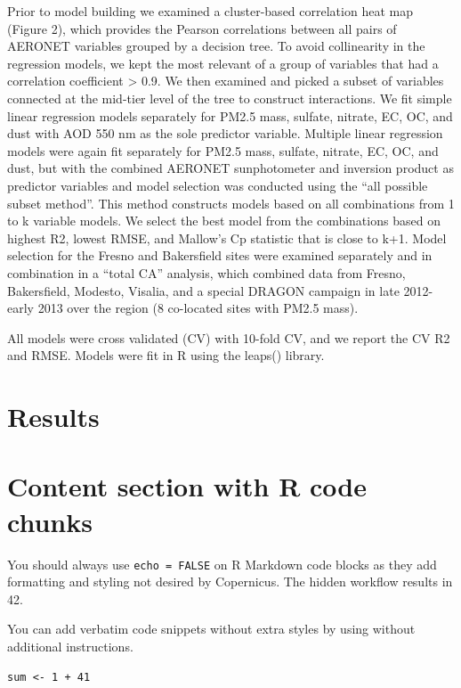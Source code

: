 \documentclass[, manuscript]{copernicus}
\begin{document}
Prior to model building we examined a cluster-based correlation heat map
(Figure 2), which provides the Pearson correlations between all pairs of
AERONET variables grouped by a decision tree. To avoid collinearity in
the regression models, we kept the most relevant of a group of variables
that had a correlation coefficient \textgreater{}
\textbar{}0.9\textbar{}. We then examined and picked a subset of
variables connected at the mid-tier level of the tree to construct
interactions. We fit simple linear regression models separately for
PM2.5 mass, sulfate, nitrate, EC, OC, and dust with AOD 550 nm as the
sole predictor variable. Multiple linear regression models were again
fit separately for PM2.5 mass, sulfate, nitrate, EC, OC, and dust, but
with the combined AERONET sunphotometer and inversion product as
predictor variables and model selection was conducted using the ``all
possible subset method''. This method constructs models based on all
combinations from 1 to k variable models. We select the best model from
the combinations based on highest R2, lowest RMSE, and Mallow's Cp
statistic that is close to k+1. Model selection for the Fresno and
Bakersfield sites were examined separately and in combination in a
``total CA'' analysis, which combined data from Fresno, Bakersfield,
Modesto, Visalia, and a special DRAGON campaign in late 2012-early 2013
over the region (8 co-located sites with PM2.5 mass).

All models were cross validated (CV) with 10-fold CV, and we report the
CV R2 and RMSE. Models were fit in R using the leaps() library.

\section{Results}

\section{Content section with R code chunks}

You should always use \texttt{echo\ =\ FALSE} on R Markdown code blocks
as they add formatting and styling not desired by Copernicus. The hidden
workflow results in 42.

You can add verbatim code snippets without extra styles by using
\texttt{\textasciigrave{}\textasciigrave{}\textasciigrave{}} without
additional instructions.

\begin{verbatim}
sum <- 1 + 41
\end{verbatim}
\end{document}
